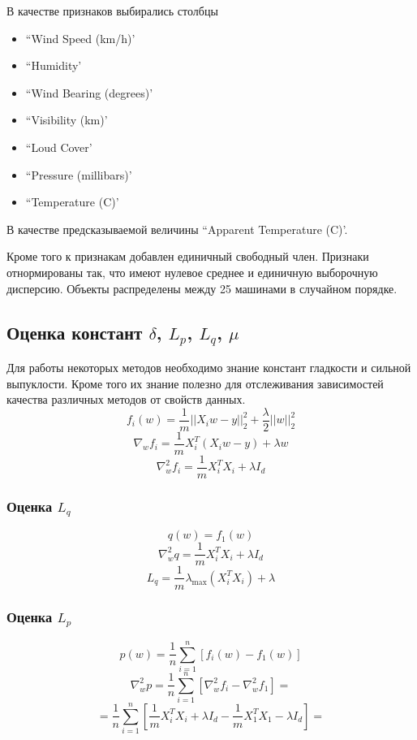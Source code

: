 \documentclass[a4paper,12pt]{extarticle}
\begin{document}
    В качестве признаков выбирались столбцы 
    \begin{itemize}
        \item ``Wind Speed (km/h)'
        \item ``Humidity'
        \item ``Wind Bearing (degrees)'
        \item ``Visibility (km)'
        \item ``Loud Cover'
        \item ``Pressure (millibars)'
        \item ``Temperature (C)'
    \end{itemize}
    В качестве предсказываемой величины ``Apparent Temperature (C)'.

    
    Кроме того к признакам добавлен единичный свободный член.
    Признаки отнормированы так, что имеют нулевое среднее и единичную выборочную дисперсию.
    Объекты распределены между 25 машинами в случайном порядке. 

    
    \subsection{Оценка констант $\delta$, $L_p$, $L_q$, $\mu$}

    Для работы некоторых методов необходимо знание констант гладкости и сильной выпуклости.
    Кроме того их знание полезно для отслеживания зависимостей качества различных методов от свойств данных. 
     \[ f_i(w) = \frac{1}{m}||X_i w - y||_2^2 + \frac{\lambda}{2} ||w||_2^2\]
    \[ \nabla_{w} f_i = \frac{1}{m}X_i^T(X_i w - y) + \lambda w\]
    \[\nabla_{w}^2 f_i  = \frac{1}{m}X_i^T X_i + \lambda I_d\]

    \subsubsection{Оценка $L_q$}
   
    \[q(w) = f_1(w) \]
    \[\nabla_{w}^2 q =  \frac{1}{m}X_i^T X_i + \lambda I_d\]
    \[L_q =  \frac{1}{m} \lambda_{\max}(X_i^T X_i ) + \lambda\]

    \subsubsection{Оценка $L_p$}
    \[p(w) = \frac{1}{n} \sum_{i=1}^{n} \left[f_i(w) - f_1(w)\right]\]
    \[\nabla_{w}^2p = \frac{1}{n}\sum_{i = 1}^{n} [\nabla_{w}^2f_i - \nabla_{w}^2f_1] = \]
    \[ = \frac{1}{n}\sum_{i = 1}^{n} [\frac{1}{m}X_i^T X_i + \lambda I_d - \frac{1}{m}X_1^T X_1- \lambda I_d] = \] 
    
\end{document}
